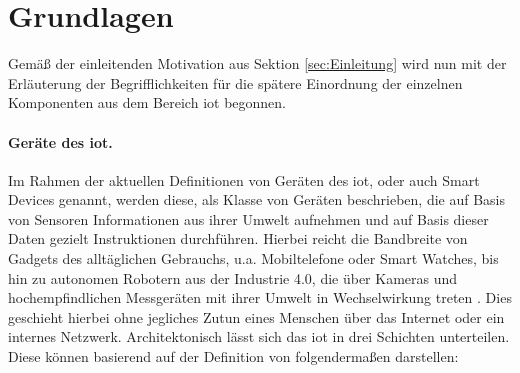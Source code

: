 
\section{Grundlagen}
\label{sec:Grundlagen}

Gemäß der einleitenden Motivation aus Sektion \ref{sec:Einleitung} wird nun mit der Erläuterung der Begrifflichkeiten für die spätere Einordnung der einzelnen Komponenten aus dem Bereich \ac{iot} begonnen.\\



\paragraph{Geräte des \acl{iot}.}
\label{sec:Grundlagen:para:Geräte des Internet of Things}
Im Rahmen der aktuellen Definitionen von Geräten des \ac{iot}, oder auch Smart Devices genannt, werden diese, als Klasse von Geräten beschrieben, die auf Basis von Sensoren Informationen aus ihrer Umwelt aufnehmen und auf Basis dieser Daten gezielt Instruktionen durchführen. Hierbei reicht die Bandbreite von Gadgets des alltäglichen Gebrauchs, u.a. Mobiltelefone oder Smart Watches, bis hin zu autonomen Robotern aus der Industrie 4.0, die über Kameras und hochempfindlichen Messgeräten mit ihrer Umwelt in Wechselwirkung treten \cite{Li2015}. Dies geschieht hierbei ohne jegliches Zutun eines Menschen über das Internet oder ein internes Netzwerk. Architektonisch lässt sich das \ac{iot} in drei Schichten unterteilen. Diese können basierend auf der Definition von \cite{Seliem2018} folgendermaßen darstellen:

